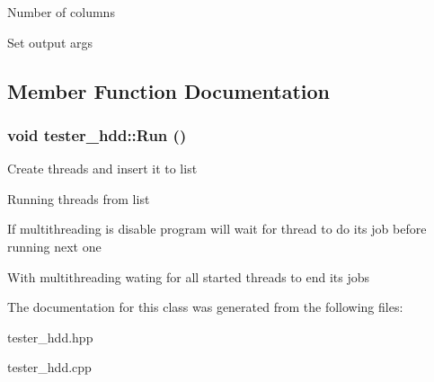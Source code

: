 Number of columns

Set output args 



\subsection{Member Function Documentation}
\hypertarget{classtester__hdd_abfdcc395e8be504dfd0ea686da790375}{
\subsubsection[{Run}]{\setlength{\rightskip}{0pt plus 5cm}void tester\_\-hdd::Run ()}}
\label{classtester__hdd_abfdcc395e8be504dfd0ea686da790375}


Create threads and insert it to list

Running threads from list

If multithreading is disable program will wait for thread to do its job before running next one

With multithreading wating for all started threads to end its jobs 



The documentation for this class was generated from the following files:\begin{DoxyCompactItemize}
\item 
tester\_\-hdd.hpp\item 
tester\_\-hdd.cpp\end{DoxyCompactItemize}
